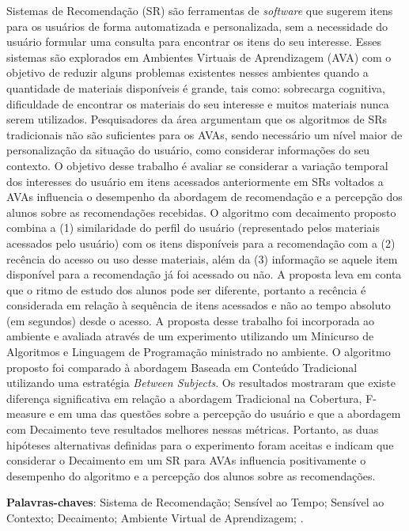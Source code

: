 

\begin{resumo}
  Sistemas de Recomendação (SR) são ferramentas de \textit{software} que sugerem itens para os usuários de forma automatizada e
  personalizada, sem a necessidade do usuário formular uma consulta para encontrar os itens do seu interesse. Esses
  sistemas são explorados em Ambientes Virtuais de Aprendizagem (AVA) com o objetivo de reduzir alguns problemas
  existentes nesses ambientes quando a quantidade de materiais disponíveis é grande, tais como: sobrecarga cognitiva,
  dificuldade de encontrar os materiais do seu interesse e muitos materiais nunca serem utilizados. Pesquisadores da
  área argumentam que os algoritmos de SRs tradicionais não são suficientes para os AVAs, sendo necessário um nível
  maior de personalização da situação do usuário, como considerar informações do seu contexto. O objetivo desse trabalho é
  avaliar se considerar a variação temporal dos interesses do usuário em itens acessados anteriormente em SRs voltados a AVAs
  influencia o desempenho da abordagem de recomendação e a percepção dos alunos sobre as recomendações recebidas. O
  algoritmo com decaimento proposto combina a (1) similaridade do perfil do usuário
  (representado pelos materiais acessados pelo usuário) com os itens disponíveis para a recomendação com a (2) recência
  do acesso ou uso desse materiais, além da (3) informação se aquele item disponível para a recomendação já foi acessado
  ou não. A proposta leva em conta que o ritmo de estudo dos alunos pode ser diferente, portanto a recência é
  considerada em relação à sequência de itens acessados e não ao tempo absoluto (em segundos) desde o acesso. A proposta
  desse trabalho foi incorporada ao ambiente \adaptwebspace e avaliada através de um experimento utilizando um Minicurso
  de Algoritmos e Linguagem de Programação ministrado no ambiente. O algoritmo proposto foi comparado à abordagem
  Baseada em Conteúdo Tradicional utilizando uma estratégia \textit{Between Subjects}. Os resultados mostraram
  que existe diferença significativa em relação a abordagem Tradicional na Cobertura, F-measure e em uma das questões
  sobre a percepção do usuário e que a abordagem com Decaimento teve resultados melhores nessas métricas. Portanto, as
  duas hipóteses alternativas definidas para o experimento foram aceitas e indicam que considerar o Decaimento em um SR
  para AVAs influencia positivamente o desempenho do algoritmo e a percepção dos alunos sobre as recomendações.

  \vspace{\onelineskip}

  \noindent
  \textbf{Palavras-chaves}: Sistema de Recomendação; Sensível ao Tempo; Sensível ao Contexto; Decaimento; Ambiente Virtual de Aprendizagem; \adaptweb.
\end{resumo}

